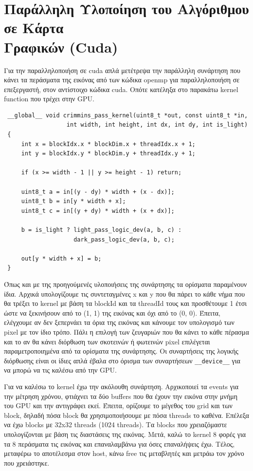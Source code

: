 
\section[Παράλληλη Υλοποίηση του Αλγόριθμου σε Κάρτα Γραφικών (Cuda)]{Παράλληλη Υλοποίηση του Αλγόριθμου σε Κάρτα\\[-0.8em] Γραφικών (Cuda)}

Για την παραλληλοποιήση σε cuda απλά μετέτρεψα την παράλληλη συνάρτηση που κάνει τα περάσματα της εικόνας από των κώδικα openmp για παραλληλοποιήση σε επεξεργαστή, στον αντίστοιχο κώδικα cuda. Οπότε κατέληξα στο παρακάτω kernel function που τρέχει στην GPU.

\begin{verbatim}
 __global__ void crimmins_pass_kernel(uint8_t *out, const uint8_t *in,
                  int width, int height, int dx, int dy, int is_light)
 {
     int x = blockIdx.x * blockDim.x + threadIdx.x + 1;
     int y = blockIdx.y * blockDim.y + threadIdx.y + 1;

     if (x >= width - 1 || y >= height - 1) return;

     uint8_t a = in[(y - dy) * width + (x - dx)];
     uint8_t b = in[y * width + x];
     uint8_t c = in[(y + dy) * width + (x + dx)];

     b = is_light ? light_pass_logic_dev(a, b, c) :
                    dark_pass_logic_dev(a, b, c);

     out[y * width + x] = b;
 }
\end{verbatim}

Όπως και με της προηγούμενές υλοποιήσεις της συνάρτησης τα ορίσματα παραμένουν ίδια. Αρχικά υπολογίζουμε τις συντεταγμένες x και y που θα πάρει το κάθε νήμα που θα τρέξει το kernel με βάση τα blockId και τα threadId τους και προσθέτουμε 1 έτσι ώστε να ξεκινήσουν από το (1, 1) της εικόνας και όχι από το (0, 0). Έπειτα, ελέγχουμε αν δεν ξεπερνάει τα όρια της εικόνας και κάνουμε τον υπολογισμό των pixel με τον ίδιο τρόπο. Πάλι η επιλογή των ζευγαριών που θα κάνει το κάθε πέρασμα και το αν θα κάνει διόρθωση των σκοτεινών ή φωτεινών pixel επιλέγεται παραμετροποιημένα από τα ορίσματα της συνάρτησης. Οι συναρτήσεις της λογικής διόρθωσης είναι οι ίδιες απλά έβαλα στο όρισμα των συναρτήσεων \verb|__device__| για να μπορώ να τις καλέσω από την GPU.

Για να καλέσω το kernel έχω την ακόλουθη συνάρτηση. Αρχικοποιεί τα events για την μέτρηση χρόνου, φτιάχνει τα δύο buffers που θα έχουν την εικόνα στην μνήμη του GPU και την αντιγράφει εκεί. Έπειτα, ορίζουμε το μέγεθος του grid και των block, δηλαδή πόσα block θα χρησιμοποιήσουμε με πόσα threads το καθένα. Επέλεξα να έχω blocks με 32x32 threads (1024 threads). Τα blocks που χρειαζόμαστε υπολογίζονται με βάση τις διαστάσεις της εικόνας.
Μετά, καλώ το kernel 8 φορές για τα 8 περάσματα τις εικόνας και επαναλαμβάνω για όσες επαναλήψεις έχω. Τέλος, μεταφέρω το αποτέλεσμα στον host, κάνω free τις μεταβλητές και μετράω τον χρόνο που χρειάστηκε.


